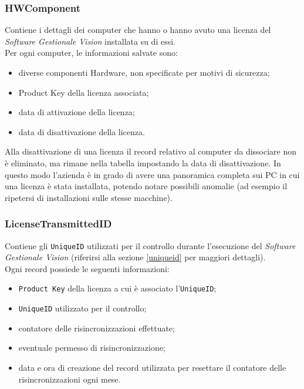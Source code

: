 \subsubsection{HWComponent}

Contiene i dettagli dei computer che hanno o hanno avuto una licenza del \textit{Software Gestionale Vision} installata su di essi. \\Per ogni computer, le informazioni salvate sono:

\begin{itemize}
\item diverse componenti Hardware, non specificate per motivi di sicurezza;
\item Product Key della licenza associata;
\item data di attivazione della licenza;
\item data di disattivazione della licenza.
\end{itemize}

Alla disattivazione di una licenza il record relativo al computer da dissociare non è eliminato, ma rimane nella tabella impostando la data di disattivazione. In questo modo l'azienda è in grado di avere una panoramica completa sui PC in cui una licenza è stata installata, potendo notare possibili anomalie (ad esempio il ripetersi di installazioni sulle stesse macchine). 

\subsubsection{LicenseTransmittedID}

Contiene gli \texttt{UniqueID} utilizzati per il controllo durante l’esecuzione del \textit{Software Gestionale Vision} (riferirsi alla sezione \ref{uniqueid} per maggiori dettagli). \\Ogni record possiede le seguenti informazioni:

\begin{itemize}
\item \texttt{Product Key} della licenza a cui è associato l'\texttt{UniqueID};
\item \texttt{UniqueID} utilizzato per il controllo;
\item contatore delle risincronizzazioni effettuate;
\item eventuale permesso di risincronizzazione;
\item data e ora di creazione del record utilizzata per resettare il contatore delle risincronizzazioni ogni mese.
\end{itemize}

